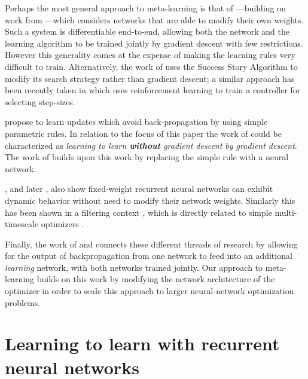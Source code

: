 \documentclass{article}
\begin{document}
Perhaps the most general approach to meta-learning is that of
\cite{schmidhuber:1992, schmidhuber:1993}---building on work from
\citep{schmidhuber:1987}---which considers networks that are able to modify
their own weights. Such a system is differentiable end-to-end, allowing both
the network and the learning algorithm to be trained jointly by gradient
descent with few restrictions.  However this generality comes at the expense of
making the learning rules very difficult to train.  Alternatively, the work of
\cite{schmidhuber:1997} uses the Success Story Algorithm to modify its search
strategy rather than gradient descent; a similar approach has been recently
taken in \cite{daniel:2016} which uses reinforcement learning to train a
controller for selecting step-sizes.

\cite{bengio:1990, bengio:1995} propose to learn updates which avoid
back-propagation by using simple parametric rules. In relation to the focus of
this paper the work of \citeauthor{bengio:1990} could be characterized as
\emph{learning to learn \textbf{without} gradient descent by gradient descent}.
The work of \cite{runarsson:2000} builds upon this work by replacing the simple
rule with a neural network.

\cite{cotter:1990}, and later \cite{younger:1999}, also show fixed-weight
recurrent neural networks can exhibit dynamic behavior without need to modify
their network weights. Similarly this has been shown in a filtering context
\citep[e.g.][]{feldkamp:1998}, which is directly related to simple
multi-timescale optimizers \citep{sutton:1992, schraudolph:1999}.

Finally, the work of \cite{younger:2001} and \cite{hochreiter:2001} connects
these different threads of research by allowing for the output of
backpropagation from one network to feed into an additional \emph{learning}
network, with both networks trained jointly. Our approach to meta-learning
builds on this work by modifying the network architecture of the optimizer in
order to scale this approach to larger neural-network optimization problems.

\section{Learning to learn with recurrent neural networks}
\label{sec:learning-to-learn}
\end{document}
